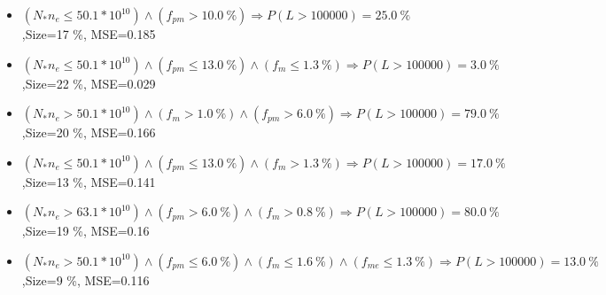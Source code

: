 \documentclass[numbered]{CSL}
\begin{document}
\begin{itemize}
\item $(N_* n_e \leq 50.1 * 10^{10}) \land (f_{pm} > 10.0~\%) \Rightarrow P(L > 100 000) = 25.0~\%$,\hfill Size=17 \%, MSE=0.185
\item $(N_* n_e \leq 50.1 * 10^{10}) \land (f_{pm} \leq 13.0~\%) \land (f_m \leq 1.3~\%) \Rightarrow P(L > 100 000) = 3.0~\%$,\hfill Size=22 \%, MSE=0.029
\item $(N_* n_e > 50.1 * 10^{10}) \land (f_m > 1.0~\%) \land (f_{pm} > 6.0~\%) \Rightarrow P(L > 100 000) = 79.0~\%$,\hfill Size=20 \%, MSE=0.166
\item $(N_* n_e \leq 50.1 * 10^{10}) \land (f_{pm} \leq 13.0~\%) \land (f_m > 1.3~\%) \Rightarrow P(L > 100 000) = 17.0~\%$,\hfill Size=13 \%, MSE=0.141
\item $(N_* n_e > 63.1 * 10^{10}) \land (f_{pm} > 6.0~\%) \land (f_m > 0.8~\%) \Rightarrow P(L > 100 000) = 80.0~\%$,\hfill Size=19 \%, MSE=0.16
\item $(N_* n_e > 50.1 * 10^{10}) \land (f_{pm} \leq 6.0~\%) \land (f_m \leq 1.6~\%) \land (f_{me} \leq 1.3~\%) \Rightarrow P(L > 100 000) = 13.0~\%$,\hfill Size=9 \%, MSE=0.116
\end{itemize}
\end{document}
